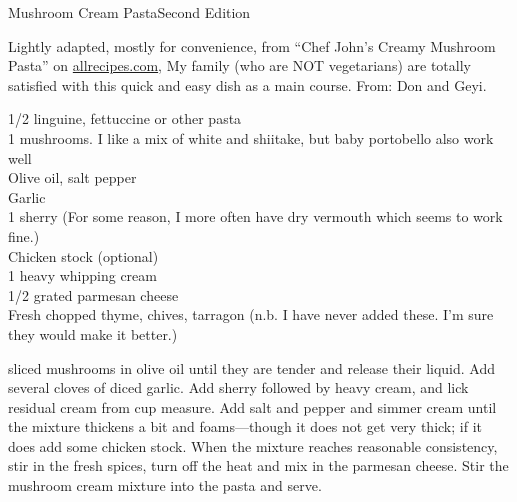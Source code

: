
\begin{entry}{Mushroom Cream Pasta}{Second Edition}

\begin{open}
    Lightly adapted, mostly for convenience, from ``Chef John's Creamy Mushroom
    Pasta'' on \url{allrecipes.com}, My family (who are NOT vegetarians) are
    totally satisfied with this quick and easy dish as a main course. From: Don
    and Geyi.
\end{open}
\begin{ingredients}
    \SI{1/2}{\pound} linguine, fettuccine or other pasta\\
    \SI{1}{\pound} mushrooms. I like a mix of white and shiitake, but baby
    portobello also work well\\
    Olive oil, salt pepper\\
    Garlic\\
    \SI{1}{\tblspoon} sherry (For some reason, I more often have dry vermouth
    which seems to work fine.) \\
    Chicken stock (optional)\\
    \SI{1}{\cup} heavy whipping cream\\
    \SI{1/2}{\cup} grated parmesan cheese\\
    Fresh chopped thyme, chives, tarragon (n.b. I have never added these. I'm
    sure  they would make it better.)
\end{ingredients}
\Saute sliced mushrooms in olive oil until they are tender and release their
liquid. Add several cloves of diced garlic. Add sherry followed by heavy cream,
and lick residual cream from cup measure. Add salt and pepper and simmer cream
until the mixture thickens a bit and foams---though it does not get very thick;
if it does add some chicken stock. When the mixture reaches reasonable
consistency, stir in the fresh spices, turn off the heat and mix in the parmesan
cheese. Stir the mushroom cream mixture into the pasta and serve.
\end{entry}

